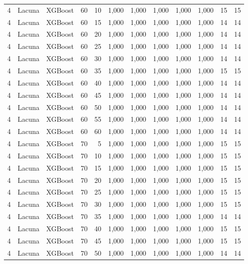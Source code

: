 \begin{longtable}{ccclrrrrrrrr}
4 & Lacuna & XGBoost & 60 & 10 & 1,000 & 1,000 & 1,000 & 1,000 & 1,000 & 15 & 15 \\
4 & Lacuna & XGBoost & 60 & 15 & 1,000 & 1,000 & 1,000 & 1,000 & 1,000 & 14 & 14 \\
4 & Lacuna & XGBoost & 60 & 20 & 1,000 & 1,000 & 1,000 & 1,000 & 1,000 & 14 & 14 \\
4 & Lacuna & XGBoost & 60 & 25 & 1,000 & 1,000 & 1,000 & 1,000 & 1,000 & 14 & 14 \\
4 & Lacuna & XGBoost & 60 & 30 & 1,000 & 1,000 & 1,000 & 1,000 & 1,000 & 14 & 14 \\
4 & Lacuna & XGBoost & 60 & 35 & 1,000 & 1,000 & 1,000 & 1,000 & 1,000 & 15 & 15 \\
4 & Lacuna & XGBoost & 60 & 40 & 1,000 & 1,000 & 1,000 & 1,000 & 1,000 & 14 & 14 \\
4 & Lacuna & XGBoost & 60 & 45 & 1,000 & 1,000 & 1,000 & 1,000 & 1,000 & 14 & 14 \\
4 & Lacuna & XGBoost & 60 & 50 & 1,000 & 1,000 & 1,000 & 1,000 & 1,000 & 14 & 14 \\
4 & Lacuna & XGBoost & 60 & 55 & 1,000 & 1,000 & 1,000 & 1,000 & 1,000 & 14 & 14 \\
4 & Lacuna & XGBoost & 60 & 60 & 1,000 & 1,000 & 1,000 & 1,000 & 1,000 & 14 & 14 \\
4 & Lacuna & XGBoost & 70 & 5 & 1,000 & 1,000 & 1,000 & 1,000 & 1,000 & 15 & 15 \\
4 & Lacuna & XGBoost & 70 & 10 & 1,000 & 1,000 & 1,000 & 1,000 & 1,000 & 15 & 15 \\
4 & Lacuna & XGBoost & 70 & 15 & 1,000 & 1,000 & 1,000 & 1,000 & 1,000 & 15 & 15 \\
4 & Lacuna & XGBoost & 70 & 20 & 1,000 & 1,000 & 1,000 & 1,000 & 1,000 & 15 & 15 \\
4 & Lacuna & XGBoost & 70 & 25 & 1,000 & 1,000 & 1,000 & 1,000 & 1,000 & 15 & 15 \\
4 & Lacuna & XGBoost & 70 & 30 & 1,000 & 1,000 & 1,000 & 1,000 & 1,000 & 15 & 15 \\
4 & Lacuna & XGBoost & 70 & 35 & 1,000 & 1,000 & 1,000 & 1,000 & 1,000 & 14 & 14 \\
4 & Lacuna & XGBoost & 70 & 40 & 1,000 & 1,000 & 1,000 & 1,000 & 1,000 & 15 & 15 \\
4 & Lacuna & XGBoost & 70 & 45 & 1,000 & 1,000 & 1,000 & 1,000 & 1,000 & 15 & 15 \\
4 & Lacuna & XGBoost & 70 & 50 & 1,000 & 1,000 & 1,000 & 1,000 & 1,000 & 14 & 14 \\

\end{longtable}
